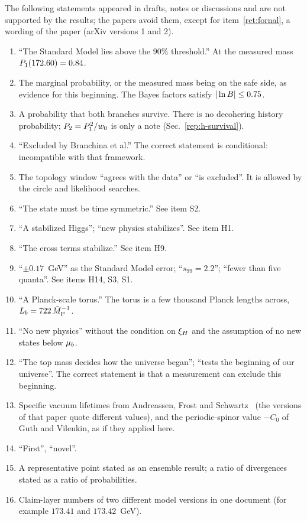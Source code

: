 The following statements appeared in drafts, notes or discussions and are not supported by the results; the papers avoid them, except for item~\ref{ret:fornal}, a wording of the paper (arXiv versions 1 and 2).
\begin{enumerate}
\item ``The Standard Model lies above the $90\%$ threshold.'' At the measured mass $P_1(172.60)=0.84$.
\item The marginal probability, or the measured mass being on the safe side, as evidence for this beginning. The Bayes factors satisfy $|\ln B|\le0.75$.
\item A probability that both branches survive. There is no decohering history probability; $P_2=P_1^2/w_0$ is only a note (Sec.~\ref{rep:h-survival}).
\item ``Excluded by Branchina et al.'' The correct statement is conditional: incompatible with that framework.
\item The topology window ``agrees with the data'' or ``is excluded''. It is allowed by the circle and likelihood searches.
\item ``The state must be time symmetric.'' See item S2.
\item ``A stabilized Higgs''; ``new physics stabilizes''. See item H1.
\item ``The cross terms stabilize.'' See item H9.
\item ``$\pm0.17$~GeV'' as the Standard Model error; ``$s_{99}=2.2$''; ``fewer than five quanta''. See items H14, S3, S1.
\item ``A Planck-scale torus.'' The torus is a few thousand Planck lengths across, $L_b=722\,\bar M_{\mathrm{P}}^{-1}$.
\item ``No new physics'' without the condition on $\xi_H$ and the assumption of no new states below $\mu_b$.
\item ``The top mass decides how the universe began''; ``tests the beginning of our universe''. The correct statement is that a measurement can exclude this beginning.
\item Specific vacuum lifetimes from Andreassen, Frost and Schwartz~\cite{Andreassen:2017rzq} (the versions of that paper quote different values), and the periodic-spinor value $-C_0$ of Guth and Vilenkin, as if they applied here.
\item ``First'', ``novel''.
\item A representative point stated as an ensemble result; a ratio of divergences stated as a ratio of probabilities.
\item Claim-layer numbers of two different model versions in one document (for example $173.41$ and $173.42$~GeV).

\end{enumerate}
